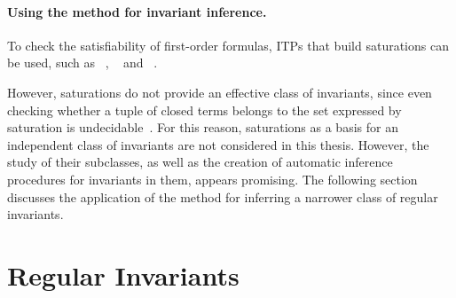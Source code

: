 \paragraph{Using the method for invariant inference.}
To check the satisfiability of first-order formulas, ITPs that build saturations can be used, such as \vampire{}~\cite{kovacs2013first}, \eprover{}~\cite{10.5555/1218615.1218621} and \zipperposition{}~\cite {10.1007/978-3-319-66167-4_10}.

However, saturations do not provide an effective class of invariants, since even checking whether a tuple of closed terms belongs to the set expressed by saturation is undecidable~\cite{4556689}.
For this reason, saturations as a basis for an independent class of invariants are not considered in this thesis. However, the study of their subclasses, as well as the creation of automatic inference procedures for invariants in them, appears promising.
The following section discusses the application of the method for inferring a narrower class of regular invariants.


\section{Regular Invariants}\label{sec:fmf/regular}

